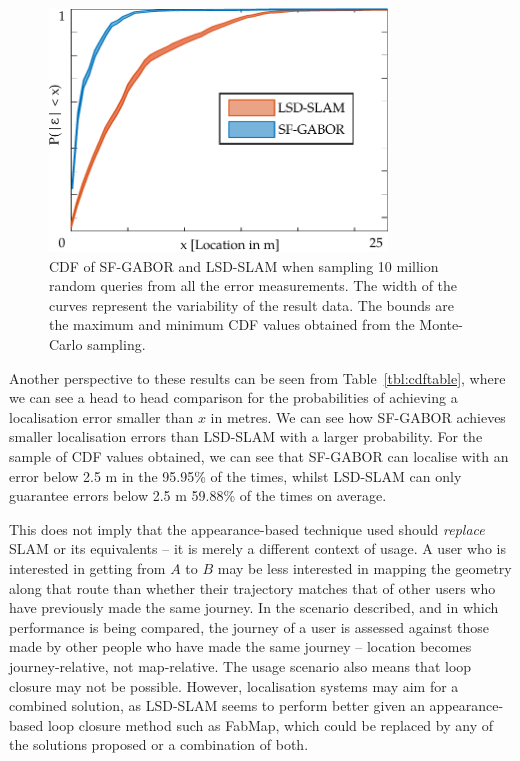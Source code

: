 \begin{figure}
\centering
\includegraphics[width=0.8\textwidth]{gfx/Chapter04/SF_GABORvsLSD_SLAM.pdf}
\caption{CDF of SF-GABOR and LSD-SLAM when sampling 10 million random queries from all the error measurements. The width of the curves represent the variability of the result data. The bounds are the maximum and minimum CDF values obtained from the Monte-Carlo sampling.}
\label{fig:cdf}
\end{figure}

Another perspective to these results can be seen from Table~\ref{tbl:cdftable}, where we can see a head to head comparison for the probabilities of achieving a localisation error smaller than $x$ in metres. We can see how SF-GABOR achieves smaller localisation errors than LSD-SLAM with a larger probability. For the sample of CDF values obtained, we can see that SF-GABOR can localise with an error below 2.5 m in the 95.95\% of the times, whilst LSD-SLAM can only guarantee errors below 2.5 m 59.88\% of the times on average.

This does not imply that the appearance-based technique used should \textit{replace} SLAM or its equivalents -- it is merely a different context of usage. A user who is interested in getting from $A$ to $B$ may be less interested in mapping the geometry along that route than whether their trajectory matches that of other users who have previously made the same journey. In the scenario described, and in which performance is being compared, the journey of a user is assessed against those made by other people who have made the same journey -- location becomes journey-relative, not map-relative. The usage scenario also means that loop closure may not be possible. However, localisation systems may aim for a combined solution, as LSD-SLAM seems to perform better given an appearance-based loop closure method \citep{engel14eccv} such as FabMap, which could be replaced by any of the solutions proposed \citep{Rivera-Rubio2015PRL} or a combination of both.

